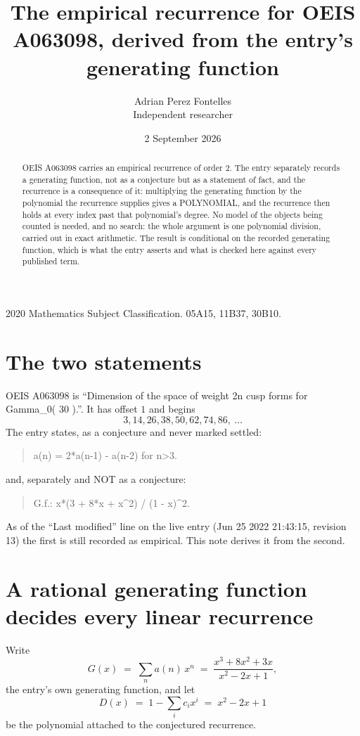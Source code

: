 \documentclass[11pt,a4paper]{article}
\title{The empirical recurrence for OEIS A063098, derived from the entry's generating function}
\author{Adrian Perez Fontelles\\ \small Independent researcher}
\date{2 September 2026}
\theoremstyle{plain}
\theoremstyle{definition}
\begin{document}
\maketitle

\begin{abstract}
OEIS A063098 carries an empirical recurrence of order $2$. The entry separately records a
generating function, not as a conjecture but as a statement of fact, and the recurrence is a
consequence of it: multiplying the generating function by the polynomial the recurrence
supplies gives a POLYNOMIAL, and the recurrence then holds at every index past that
polynomial's degree. No model of the objects being counted is needed, and no search: the
whole argument is one polynomial division, carried out in exact arithmetic. The result is
conditional on the recorded generating function, which is what the entry asserts and what is
checked here against every published term.
\end{abstract}

\noindent\small 2020 Mathematics Subject Classification. 05A15, 11B37, 30B10.\normalsize

\section{The two statements}

OEIS A063098 is ``Dimension of the space of weight 2n cusp forms for Gamma\_0( 30 ).''. It has offset $1$ and begins
\[
3, 14, 26, 38, 50, 62, 74, 86,\ \dots
\]
The entry states, as a conjecture and never marked settled:
\begin{quote}
a(n) = 2*a(n-1) - a(n-2) for n>3.
\end{quote}
and, separately and NOT as a conjecture:
\begin{quote}
G.f.: x*(3 + 8*x + x\^{}2) / (1 - x)\^{}2.
\end{quote}
As of the ``Last modified'' line on the live entry (Jun 25 2022 21:43:15, revision 13) the first is still
recorded as empirical. This note derives it from the second.

\section{A rational generating function decides every linear recurrence}

Write
\[
G(x)\;=\;\sum_{n}a(n)\,x^{n}\;=\;\frac{x^{3} + 8 x^{2} + 3 x}{x^{2} - 2 x + 1},
\]
the entry's own generating function, and let
\[
D(x)\;=\;1-\sum_i c_i x^{i}\;=\;x^{2} - 2 x + 1
\]
be the polynomial attached to the conjectured recurrence.
\end{document}
